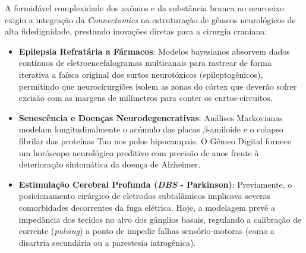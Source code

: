 A formidável complexidade dos axônios e da substância branca no neuroeixo exigiu a integração da \textit{Connectomics} na estruturação de gêmeos neurológicos de alta fidedignidade, prestando inovações diretas para a cirurgia craniana:

\begin{itemize}
    \item \textbf{Epilepsia Refratária a Fármacos}: Modelos bayesianos absorvem dados contínuos de eletroencefalogramas multicanais para rastrear de forma iterativa a faísca original dos surtos neurotóxicos (epileptogênicos), permitindo que neurocirurgiões isolem as zonas do córtex que deverão sofrer excisão com as margens de milímetros para conter os curtos-circuitos.
    \item \textbf{Senescência e Doenças Neurodegenerativas}: Análises Markovianas modelam longitudinalmente o acúmulo das placas $\beta$-amiloide e o colapso fibrilar das proteínas Tau nos polos hipocampais. O Gêmeo Digital fornece um horóscopo neurológico preditivo com precisão de anos frente à deterioração sintomática da doença de Alzheimer.
    \item \textbf{Estimulação Cerebral Profunda (\textit{DBS} - Parkinson)}: Previamente, o posicionamento cirúrgico de eletrodos subtalâmicos implicava severas comorbidades decorrentes da fuga elétrica. Hoje, a modelagem prevê a impedância dos tecidos no alvo dos gânglios basais, regulando a calibração de corrente (\textit{pulsing}) a ponto de impedir falhas sensório-motoras (como a disartria secundária ou a parestesia iatrogênica).
\end{itemize}
